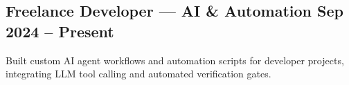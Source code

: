 \subsection[Freelance Developer --- AI and Automation]{{Freelance Developer} \textnormal{--- AI \& Automation} \hfill Sep 2024 -- Present}
\begin{zitemize}
\item Built custom AI agent workflows and automation scripts for developer projects, integrating LLM tool calling and automated verification gates.
\end{zitemize}
\vspace{-0.3em}
